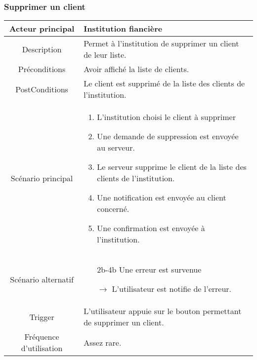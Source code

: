 \documentclass{article}
\begin{document}
\subsubsection{Supprimer un client}
\begin{table}[h]
   \begin{tabular}{|c|p{10cm}|}
      \hline
      Acteur principal&Institution fiancière\\
      \hline
      Description&Permet à l'institution de supprimer un client de leur liste.\\
      \hline
      Préconditions&Avoir affiché la liste de clients.\\
      \hline
      PostConditions&Le client est supprimé de la liste des clients de l'institution.\\
      \hline
      Scénario principal& 
            \begin{enumerate}
               \item L'institution choisi le client à supprimer
               \item Une demande de suppression est envoyée au serveur.
               \item Le serveur supprime le client de la liste des clients de l'institution.
               \item Une notification est envoyée au client concerné.
               \item Une confirmation est envoyée à l'institution.
            \end{enumerate}     \\
      \hline
      Scénario alternatif&
            \begin{itemize}
               \item[2b-4b] Une erreur est survenue
               \item[$\rightarrow$] L'utilisateur est notifie de l'erreur.  
            \end{itemize}\\
      \hline
      Trigger&L'utilisateur appuie sur le bouton permettant de supprimer un client.\\
      \hline
      Fréquence d'utilisation&Assez rare.\\
      \hline
   \end{tabular}
\end{table}

\newpage
\end{document}
